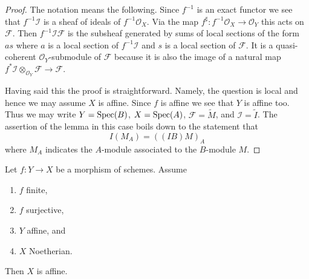 \begin{proof}
The notation means the following. Since $f^{-1}$ is an exact functor
we see that $f^{-1}\mathcal{I}$ is a sheaf
of ideals of $f^{-1}\mathcal{O}_X$. Via the map
$f^\sharp : f^{-1}\mathcal{O}_X \to \mathcal{O}_Y$ this acts on
$\mathcal{F}$. Then $f^{-1}\mathcal{I}\mathcal{F}$ is the subsheaf
generated by sums of local sections of the form $as$ where $a$
is a local section of $f^{-1}\mathcal{I}$ and $s$ is a local section
of $\mathcal{F}$. It is a quasi-coherent $\mathcal{O}_Y$-submodule
of $\mathcal{F}$ because it is also the image of a natural map
$f^*\mathcal{I} \otimes_{\mathcal{O}_Y} \mathcal{F} \to \mathcal{F}$.

\medskip\noindent
Having said this the proof is straightforward. Namely, the question is local
and hence we may assume $X$ is affine. Since $f$ is affine we see that
$Y$ is affine too. Thus we may write
$Y = \mathop{\mathrm{Spec}}(B)$, $X = \mathop{\mathrm{Spec}}(A)$, $\mathcal{F} = \widetilde{M}$,
and $\mathcal{I} = \widetilde{I}$. The assertion of the lemma in this
case boils down to the statement that
$$
I(M_A) = ((IB)M)_A
$$
where $M_A$ indicates the $A$-module associated to the $B$-module $M$.
\end{proof}

\begin{lemma}
\label{lemma-image-affine-finite-morphism-affine-Noetherian}
Let $f : Y \to X$ be a morphism of schemes.
Assume
\begin{enumerate}
\item $f$ finite,
\item $f$ surjective,
\item $Y$ affine, and
\item $X$ Noetherian.
\end{enumerate}
Then $X$ is affine.
\end{lemma}

